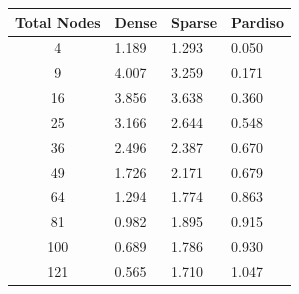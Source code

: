 \documentclass[letterpaper, 10 pt, conference]{ieeeconf}  %
\begin{document}
\begin{figure}
        \begin{minipage}[b]{.45\linewidth}
                \begin{center}
                        \begin{tabular}{|c|l|l|l|}
                                \hline
                                \textbf{Total Nodes} & \multicolumn{1}{c|}{\textbf{Dense}} & \multicolumn{1}{c|}{\textbf{Sparse}} & \multicolumn{1}{c|}{\textbf{Pardiso}} \\ \hline
                                4                    & 1.189                               & 1.293                                & 0.050                                 \\ \hline
                                9                    & 4.007                               & 3.259                                & 0.171                                 \\ \hline
                                16                   & 3.856                               & 3.638                                & 0.360                                 \\ \hline
                                25                   & 3.166                               & 2.644                                & 0.548                                 \\ \hline
                                36                   & 2.496                               & 2.387                                & 0.670                                 \\ \hline
                                49                   & 1.726                               & 2.171                                & 0.679                                 \\ \hline
                                64                   & 1.294                               & 1.774                                & 0.863                                 \\ \hline
                                81                   & 0.982                               & 1.895                                & 0.915                                 \\ \hline
                                100                  & 0.689                               & 1.786                                & 0.930                                 \\ \hline
                                121                  & 0.565                               & 1.710                                & 1.047                                 \\ \hline

\end{tabular}
\end{center}
\end{minipage}
\end{figure}
\end{document}
